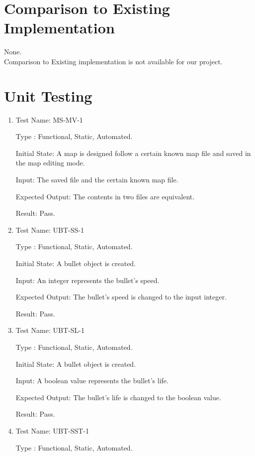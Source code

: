 \documentclass[12pt, titlepage]{article}
\begin{document}
\section{Comparison to Existing Implementation}	
None.\\Comparison to Existing implementation is not available for our project.

\section{Unit Testing}

\begin{enumerate}
\item{Test Name: MS-MV-1}

Type : Functional, Static, Automated.

Initial State: A map is designed follow a certain known map file and saved in the map editing mode.
               
Input: The saved file and the certain known map file.

Expected Output: The contents in two files are equivalent.

Result: Pass.\\

\item{Test Name: UBT-SS-1}

Type : Functional, Static, Automated.

Initial State: A bullet object is created.

Input: An integer represents the bullet's speed.

Expected Output: The bullet's speed is changed to the input integer.

Result: Pass.\\

\item{Test Name: UBT-SL-1}

Type : Functional, Static, Automated.

Initial State: A bullet object is created.

Input: A boolean value represents the bullet's life.

Expected Output: The bullet's life is changed to the boolean value.

Result: Pass.\\

\item{Test Name: UBT-SST-1}

Type : Functional, Static, Automated.


\end{enumerate}
\end{document}
